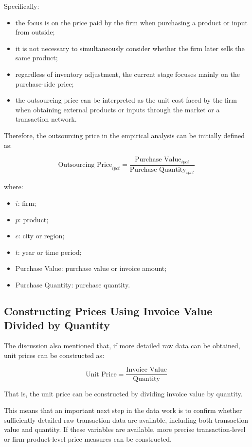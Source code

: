 \documentclass[11pt,a4paper]{article}
\begin{document}
Specifically:

\begin{itemize}
    \item the focus is on the price paid by the firm when purchasing a product or input from outside;
    \item it is not necessary to simultaneously consider whether the firm later sells the same product;
    \item regardless of inventory adjustment, the current stage focuses mainly on the purchase-side price;
    \item the outsourcing price can be interpreted as the unit cost faced by the firm when obtaining external products or inputs through the market or a transaction network.
\end{itemize}

Therefore, the outsourcing price in the empirical analysis can be initially defined as:

\[
\text{Outsourcing Price}_{i p c t}
=
\frac{\text{Purchase Value}_{i p c t}}{\text{Purchase Quantity}_{i p c t}}
\]

where:

\begin{itemize}
    \item \(i\): firm;
    \item \(p\): product;
    \item \(c\): city or region;
    \item \(t\): year or time period;
    \item Purchase Value: purchase value or invoice amount;
    \item Purchase Quantity: purchase quantity.
\end{itemize}

\subsection{Constructing Prices Using Invoice Value Divided by Quantity}

The discussion also mentioned that, if more detailed raw data can be obtained, unit prices can be constructed as:

\[
\text{Unit Price}
=
\frac{\text{Invoice Value}}{\text{Quantity}}
\]

That is, the unit price can be constructed by dividing invoice value by quantity.

This means that an important next step in the data work is to confirm whether sufficiently detailed raw transaction data are available, including both transaction value and quantity. If these variables are available, more precise transaction-level or firm-product-level price measures can be constructed.
\end{document}
